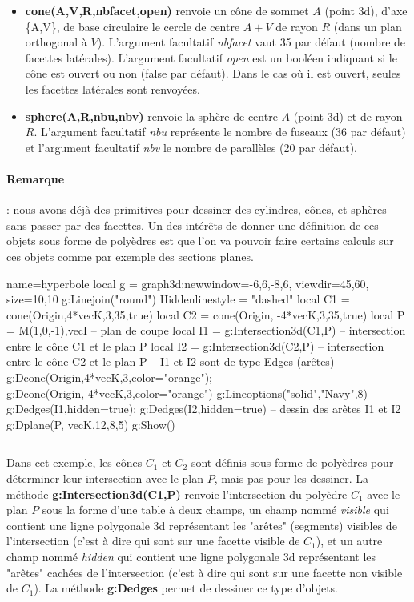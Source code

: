 \documentclass[%
10pt,%
a4paper,%
french,%
]%
{article}%
\newenvironment*{demo}[2][]{%
\gdef\legende{#2}%
\gdef\lab{#1}%
\bgroup
\VerbatimOut{\jobname.tmp}%
}%
{%
\endVerbatimOut%
\egroup%
\inputminted[ignorelexererrors=true,breaklines,bgcolor=Beige,linenos,numbersep=6pt,frame=single,fontsize=\footnotesize]{Lua}{\jobname.tmp}%
\begin{minipage}{0.9\textwidth}
\begin{center}
\captionof{figure}{\legende}\label{\lab}%
%
\end{center}
\end{minipage}
}
\begin{document}
\begin{itemize}
    \item \textbf{cone(A,V,R,nbfacet,open)} renvoie un cône de sommet $A$ (point 3d), d'axe \{A,V\}, de base circulaire le cercle de centre $A+V$ de rayon $R$ (dans un plan orthogonal à $V$). L'argument facultatif \emph{nbfacet} vaut 35 par défaut (nombre de facettes latérales). L'argument facultatif \emph{open} est un booléen indiquant si le cône est ouvert ou non (false par défaut). Dans le cas où il est ouvert, seules les facettes latérales sont renvoyées.

    \item \textbf{sphere(A,R,nbu,nbv)} renvoie la sphère de centre $A$ (point 3d) et de rayon $R$. L'argument facultatif \emph{nbu} représente le nombre de fuseaux (36 par défaut) et l'argument facultatif \emph{nbv} le nombre de parallèles (20 par défaut).
\end{itemize}

\paragraph{Remarque} : nous avons déjà des primitives pour dessiner des cylindres, cônes, et sphères sans passer par des facettes. Un des intérêts de donner une définition de ces objets sous forme de polyèdres est que l'on va pouvoir faire certains calculs sur ces objets comme par exemple des sections planes.

\begin{demo}{Hyperbole : intersection cône - plan}
\begin{luadraw}{name=hyperbole}
local g = graph3d:new{window={-6,6,-8,6}, viewdir={45,60}, size={10,10}}
g:Linejoin("round")
Hiddenlinestyle = "dashed"
local C1 = cone(Origin,4*vecK,3,35,true)
local C2 = cone(Origin, -4*vecK,3,35,true)
local P = {M(1,0,-1),vecI} -- plan de coupe
local I1 = g:Intersection3d(C1,P) -- intersection entre le cône C1 et le plan P
local I2 = g:Intersection3d(C2,P) -- intersection entre le cône C2 et le plan P
-- I1 et I2 sont de type Edges (arêtes)
g:Dcone(Origin,4*vecK,3,{color="orange"}); g:Dcone(Origin,-4*vecK,3,{color="orange"})
g:Lineoptions("solid","Navy",8)
g:Dedges(I1,{hidden=true}); g:Dedges(I2,{hidden=true}) -- dessin des arêtes I1 et I2
g:Dplane(P, vecK,12,8,5)
g:Show()
\end{luadraw}
\end{demo}

Dans cet exemple, les cônes $C_1$ et $C_2$ sont définis sous forme de polyèdres pour déterminer leur intersection avec le plan $P$, mais pas pour les dessiner. La méthode \textbf{g:Intersection3d(C1,P)} renvoie l'intersection du polyèdre $C_1$ avec le plan $P$ sous la forme d'une table à deux champs, un champ nommé \emph{visible} qui contient une ligne polygonale 3d représentant les "arêtes" (segments) visibles de l'intersection (c'est à dire qui sont sur une facette visible de $C_1$), et un autre champ nommé \emph{hidden} qui contient une ligne polygonale 3d représentant les "arêtes" cachées de l'intersection (c'est à dire qui sont sur une facette non visible de $C_1$). La méthode \textbf{g:Dedges} permet de dessiner ce type d'objets.
\end{document}
